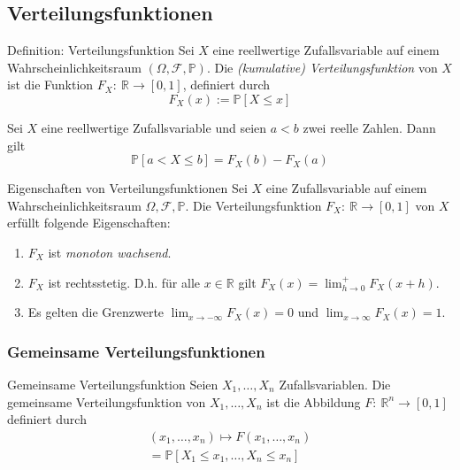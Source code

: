 \documentclass[a4paper,10pt]{article}
\def\R{\mathbb{R}}
\def\P{\mathbb{P}}
\begin{document}
\subsection{Verteilungsfunktionen}

\begin{mainbox}{Definition: Verteilungsfunktion}
    Sei \( X \) eine reellwertige Zufallsvariable auf einem Wahrscheinlichkeitsraum \( (\Omega, \mathcal{F}, \P) \). Die \emph{(kumulative) Verteilungsfunktion} von \( X \) ist die Funktion \( F_X: \: \R \to [0, 1] \), definiert durch \[ F_X(x) := \P[X \leq x] \]
\end{mainbox}

\begin{subbox}{}
    Sei \( X \) eine reellwertige Zufallsvariable und seien \( a < b \) zwei reelle Zahlen. Dann gilt \[ \P[a < X \leq b] = F_X(b) - F_X(a) \]
\end{subbox}

\begin{subbox}{Eigenschaften von Verteilungsfunktionen}
    Sei \( X \) eine Zufallsvariable auf einem Wahrscheinlichkeitsraum \( \Omega, \mathcal{F}, \P \). Die Verteilungsfunktion \( F_X: \: \R \to [0, 1] \) von \( X \) erfüllt folgende Eigenschaften:
    \begin{enumerate}
        \item \( F_X \) ist \emph{monoton wachsend}.
        \item \( F_X \) ist rechtsstetig. D.h. für alle \( x \in \R \) gilt \( F_X(x) = \lim_{h \to 0}^+ F_X(x + h) \).
        \item Es gelten die Grenzwerte \( \lim_{x \to -\infty} F_X(x) = 0 \) und \( \lim_{x \to \infty} F_X(x) = 1 \).
    \end{enumerate}
\end{subbox}


\subsubsection{Gemeinsame Verteilungsfunktionen}

\begin{mainbox}{Gemeinsame Verteilungsfunktion}
    Seien \( X_1, \dots, X_n \) Zufallsvariablen. Die gemeinsame Verteilungsfunktion von \( X_1, \dots, X_n \) ist die Abbildung \( F: \: \R^n \to [0, 1] \) definiert durch
    \begin{multline*}
        (x_1, \dots, x_n) \mapsto F(x_1, \dots, x_n) \\
        = \P[X_1 \leq x_1, \dots, X_n \leq x_n]
    \end{multline*}
\end{mainbox}
\end{document}
